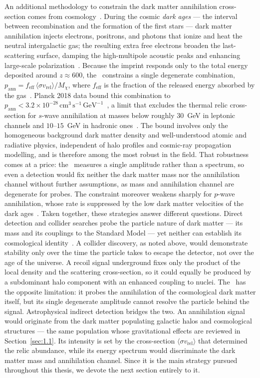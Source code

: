 An additional methodology to constrain the dark matter annihilation cross-section comes from cosmology~\cite{Lopez-Honorez:2013cua}.
During the cosmic \emph{dark ages} --- the interval between recombination and the formation of the first stars --- dark matter annihilation injects electrons, positrons, and photons that ionize and heat the neutral intergalactic gas; the resulting extra free electrons broaden the last-scattering surface, damping the high-multipole acoustic peaks and enhancing large-scale polarization~\cite{Slatyer:2015jla}.
Because the imprint responds only to the total energy deposited around $z \approx 600$, the \CMB\ constrains a single degenerate combination, $p_\text{ann} = f_\text{eff}\,\langle \sigma v_\text{rel} \rangle / M_\chi$, where $f_\text{eff}$ is the fraction of the released energy absorbed by the gas~\cite{Slatyer:2015jla}.
Planck 2018 data bound this combination to $p_\text{ann} < 3.2 \times 10^{-28}\,\text{cm}^3\,\text{s}^{-1}\,\text{GeV}^{-1}$~\cite{Aghanim:2018eyx}, a limit that excludes the thermal relic cross-section for $s$-wave annihilation at masses below roughly $30$~GeV in leptonic channels and $10$--$15$~GeV in hadronic ones~\cite{Lopez-Honorez:2013cua}.
The bound involves only the homogeneous background dark matter density and well-understood atomic and radiative physics, independent of halo profiles and cosmic-ray propagation modelling, and is therefore among the most robust in the field.
That robustness comes at a price: the \CMB\ measures a single amplitude rather than a spectrum, so even a detection would fix neither the dark matter mass nor the annihilation channel without further assumptions, as mass and annihilation channel are degenerate for \CMB probes.
The constraint moreover weakens sharply for $p$-wave annihilation, whose rate is suppressed by the low dark matter velocities of the dark ages~\cite{Cirelli:2024ssz}.
Taken together, these strategies answer different questions.
Direct detection and collider searches probe the particle nature of dark matter --- its mass and its couplings to the Standard Model --- yet neither can establish its cosmological identity~\cite{Cirelli:2024ssz}.
A collider discovery, as noted above, would demonstrate stability only over the time the particle takes to escape the detector, not over the age of the universe.
A recoil signal underground fixes only the product of the local density and the scattering cross-section, so it could equally be produced by a subdominant halo component with an enhanced coupling to nuclei.
The \CMB\ has the opposite limitation: it probes the annihilation of the cosmological dark matter itself, but its single degenerate amplitude cannot resolve the particle behind the signal.
Astrophysical indirect detection bridges the two.
An annihilation signal would originate from the dark matter populating galactic halos and cosmological structures --- the same population whose gravitational effects are reviewed in Section~\ref{sec:1.1}.
Its intensity is set by the cross-section $\langle \sigma v_\text{rel} \rangle$ that determined the relic abundance, while its energy spectrum would discriminate the dark matter mass and annihilation channel.
Since it is the main strategy pursued throughout this thesis, we devote the next section entirely to it.
